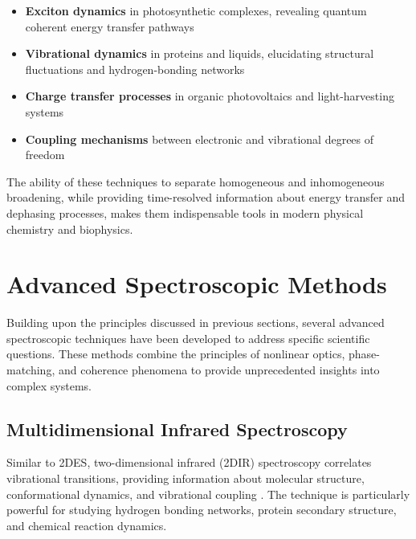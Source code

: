 \begin{itemize}
    \item \textbf{Exciton dynamics} in photosynthetic complexes, revealing quantum coherent energy transfer pathways \cite{Engel2007, Schlau-Cohen2011}
    \item \textbf{Vibrational dynamics} in proteins and liquids, elucidating structural fluctuations and hydrogen-bonding networks \cite{Hamm2011}
    \item \textbf{Charge transfer processes} in organic photovoltaics and light-harvesting systems
    \item \textbf{Coupling mechanisms} between electronic and vibrational degrees of freedom \cite{Khalil2003}
\end{itemize}

\noindent The ability of these techniques to separate homogeneous and inhomogeneous broadening, while providing time-resolved information about energy transfer and dephasing processes, makes them indispensable tools in modern physical chemistry and biophysics.


\section{Advanced Spectroscopic Methods}
\label{sec:advanced_methods}

\noindent Building upon the principles discussed in previous sections, several advanced spectroscopic techniques have been developed to address specific scientific questions. These methods combine the principles of nonlinear optics, phase-matching, and coherence phenomena to provide unprecedented insights into complex systems.

\subsection{Multidimensional Infrared Spectroscopy}
\label{subsec:2dir}

\noindent Similar to 2DES, two-dimensional infrared (2DIR) spectroscopy correlates vibrational transitions, providing information about molecular structure, conformational dynamics, and vibrational coupling \cite{Hamm2011, Khalil2003}. The technique is particularly powerful for studying hydrogen bonding networks, protein secondary structure, and chemical reaction dynamics.

